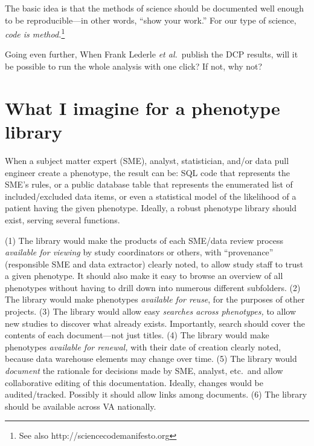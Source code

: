 \documentclass{tufte-handout}
\begin{document}
The basic idea is that the methods of science should be documented
well enough to be reproducible---in other words, ``show your work.''
For our type of science, \emph{code is method.}\footnote{See also
http://sciencecodemanifesto.org}


Going even further, When Frank Lederle \emph{et al.}\ publish the DCP
results, will it be possible to run the whole analysis with one click?
If not, why not?


\section{What I imagine for a phenotype library}

When a subject matter expert (SME), analyst, statistician, and/or data
pull engineer create a phenotype, the result can be: SQL code that
represents the SME's rules, or a public database table that represents
the enumerated list of included/excluded data items, or even a
statistical model of the likelihood of a patient having the given
phenotype. Ideally, a robust phenotype library should exist, serving
several functions.

(1) The library would make the products of each SME/data review
process \emph{available for viewing} by study coordinators or others,
with ``provenance'' (responsible SME and data extractor) clearly
noted, to allow study staff to trust a given phenotype. It should also
make it easy to browse an overview of all phenotypes without having to
drill down into numerous different subfolders. (2) The library would
make phenotypes \emph{available for reuse}, for the purposes of other
projects. (3) The library would allow easy \emph{searches across
  phenotypes,} to allow new studies to discover what already exists.
Importantly, search should cover the contents of each document---not
just titles. (4) The library would make phenotypes \emph{available for
  renewal,} with their date of creation clearly noted, because data
warehouse elements may change over time. (5) The library would
\emph{document} the rationale for decisions made by SME, analyst,
etc.\ and allow collaborative editing of this documentation. Ideally,
changes would be audited/tracked. Possibly it should allow links among
documents. (6) The library should be available across VA nationally.
\end{document}

